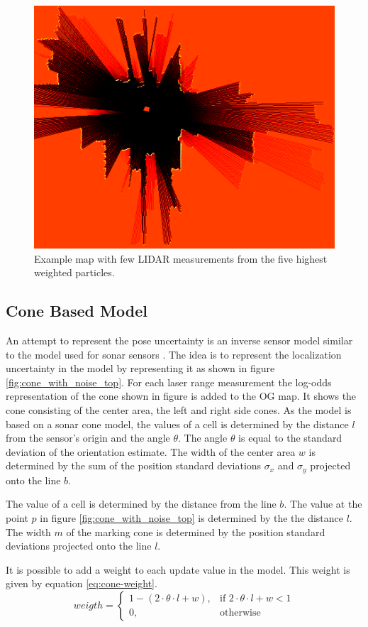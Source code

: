 \begin{figure}[htbp]
	\centering
	\includegraphics[width=0.7\linewidth]{figures/static_mapping/particle_sensor}
	\caption{Example map with few LIDAR measurements from the five highest weighted particles.}
	\label{fig:particle_sensor}
\end{figure}

\subsection{Cone Based Model}
An attempt to represent the pose uncertainty is an inverse sensor model similar to the model used for sonar sensors  \cite{probRob}.  
The idea is to represent the localization uncertainty in the model by representing it as shown in figure \vref{fig:cone_with_noise_top}.
For each laser range measurement the log-odds representation of the cone shown in figure is added to the OG map.
It shows the cone consisting of the center area, the left and right side cones. 
As the model is based on a sonar cone model, the values of a cell is determined by the distance \(l\) from the sensor's origin and the angle \(\theta\). 
The angle \(\theta\) is equal to the standard deviation of the orientation estimate. 
The width of the center area $w$ is determined by the sum of the position standard deviations $\sigma_x$ and $\sigma_y$ projected onto the line $b$. 

The value of a cell is determined by the distance from the line $b$. 
The value at the point $p$ in figure \vref{fig:cone_with_noise_top} is determined by the the distance \(l\).
The width $m$ of the marking cone is determined by the position standard deviations projected onto the line $l$.

It is possible to add a weight to each update value in the model. This weight is given by equation \vref{eq:cone-weight}.
\begin{equation}
\label{eq:cone-weight}
weigth = 
\begin{cases}
1 - ( 2 \cdot \theta \cdot l + w), & \text{if } 2 \cdot \theta \cdot l + w < 1\\
0, & \text{otherwise}
\end{cases}
\end{equation}

